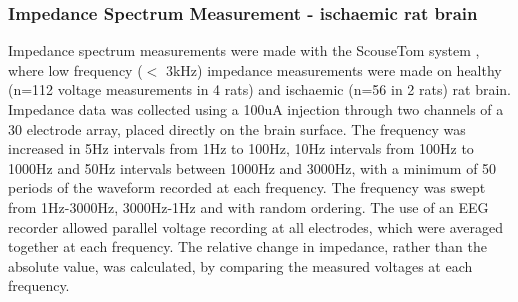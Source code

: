 \subsubsection{Impedance Spectrum Measurement - ischaemic rat brain}

Impedance spectrum measurements were made with the ScouseTom system \cite{Dowrick_2015}, where low frequency ($<$ 3kHz) impedance measurements were made on healthy (n=112 voltage measurements in 4 rats) and ischaemic (n=56 in 2 rats) rat brain. Impedance data was collected using a 100uA injection through two channels of a 30 electrode array, placed directly on the brain surface. The frequency was increased in 5Hz intervals from 1Hz to 100Hz, 10Hz intervals from 100Hz to 1000Hz and 50Hz intervals between 1000Hz and 3000Hz, with a minimum of 50 periods of the waveform recorded at each frequency. The frequency was swept from 1Hz-3000Hz, 3000Hz-1Hz and with random ordering. The use of an EEG recorder allowed parallel voltage recording at all electrodes, which were averaged together at each frequency. The relative change in impedance, rather than the absolute value, was calculated, by comparing the measured voltages at each frequency.